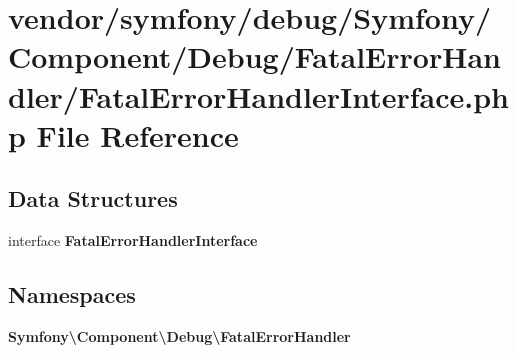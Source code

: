 \section{vendor/symfony/debug/\+Symfony/\+Component/\+Debug/\+Fatal\+Error\+Handler/\+Fatal\+Error\+Handler\+Interface.php File Reference}
\label{_fatal_error_handler_interface_8php}
\subsection*{Data Structures}
\begin{DoxyCompactItemize}
\item 
interface {\bf Fatal\+Error\+Handler\+Interface}
\end{DoxyCompactItemize}
\subsection*{Namespaces}
\begin{DoxyCompactItemize}
\item 
 {\bf Symfony\textbackslash{}\+Component\textbackslash{}\+Debug\textbackslash{}\+Fatal\+Error\+Handler}
\end{DoxyCompactItemize}
